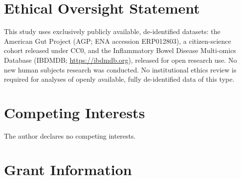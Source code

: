 \documentclass[11pt, a4paper]{article}
\newcommand{\Ibd}{IBD}
\begin{document}
\begin{abstract}
\noindent\textbf{Conclusions.}
\Ibd-associated microbiomes exhibit consistent topological simplification
across two independent cohorts and two sequencing technologies, and this
simplification tracks a clinical inflammation biomarker.
Topological features provide complementary discriminative signal to
$\alpha$-diversity indices, improving combined classification performance
and offering structural interpretability through taxon-level attribution
of loop anchors.

\smallskip\noindent
\textbf{Keywords:} persistent homology, gut microbiome, inflammatory bowel
disease, co-occurrence networks, topological data analysis, American Gut
Project, IBDMDB, calprotectin, leave-one-out attribution, bootstrap, FDR
\end{abstract}

\newpage
\tableofcontents
\newpage








\section*{Ethical Oversight Statement}

This study uses exclusively publicly available, de-identified datasets:
the American Gut Project (AGP; ENA accession ERP012803), a citizen-science
cohort released under CC0, and the Inflammatory Bowel Disease Multi-omics
Database (IBDMDB; \url{https://ibdmdb.org}), released for open research use.
No new human subjects research was conducted. No institutional ethics review
is required for analyses of openly available, fully de-identified data of this
type.

\section*{Competing Interests}

The author declares no competing interests.

\section*{Grant Information}
\end{document}
